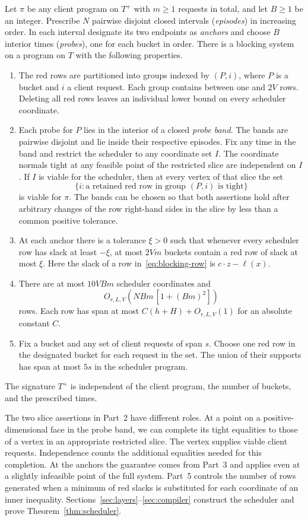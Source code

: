 \begin{theorem}[Scheduler]
Let $\pi$ be any client program on $T^+$ with $m\geq1$ requests in total,
and let $B\geq1$ be an integer. Prescribe $N$ pairwise disjoint closed intervals
(\emph{episodes}) in increasing order. In each interval designate its two
endpoints as \emph{anchors} and choose $B$ interior times
(\emph{probes}), one for each bucket in order. There is a blocking system
on a program on $T$ with the following properties.
\begin{enumerate}
\item The red rows are partitioned into groups indexed by $(P,i)$, where
$P$ is a bucket and $i$ a client request. Each group contains between one
and $2V$ rows. Deleting all red rows leaves an individual lower bound on
every scheduler coordinate.
\item Each probe for $P$ lies in the interior of a closed \emph{probe band}.
The bands are pairwise disjoint and lie inside their respective episodes.
Fix any time in the band and restrict the scheduler to any
coordinate set $I$. The coordinate normals tight at any feasible point of
the restricted slice are independent on $I$. If $I$ is viable for the
scheduler, then at every vertex of that slice the set
\[
   \{i:\text{a retained red row in group }(P,i)\text{ is tight}\}
\]
is viable for $\pi$. The bands can be chosen so that both assertions hold
after arbitrary changes of the row right-hand sides in the slice by less
than a common positive tolerance.
\item At each anchor there is a tolerance $\xi>0$ such that whenever
every scheduler row has slack at least $-\xi$, at most $2Vm$ buckets
contain a red row of slack at most $\xi$. Here the slack of a row
in~\eqref{eq:blocking-row} is $c\cdot z-\ell(x)$.
\item There are at most $10VBm$ scheduler coordinates and
\[
               O_{r,L,V}\!\left(NBm\,[1+(Bm)^2]\right)
\]
rows. Each row has span at most $C(h+H)+O_{r,L,V}(1)$ for an absolute
constant $C$.
\item Fix a bucket and any set of client requests of span $s$. Choose one
red row in the designated bucket for each request in the set. The union
of their supports has span at most $5s$ in the scheduler program.
\end{enumerate}
The signature $T^+$ is independent of the client program, the number of
buckets, and the prescribed times.
\end{theorem}

The two slice assertions in Part~2 have different roles. At a point on a
positive-dimensional face in the probe band, we can complete its tight
equalities to those of a vertex in an appropriate restricted slice. The
vertex supplies viable client requests. Independence counts the additional
equalities needed for this completion. At the anchors the guarantee comes
from Part~3 and applies even at a slightly infeasible point of the full
system. Part~5 controls the number of rows generated when a minimum of
red slacks is substituted for each coordinate of an inner inequality.
Sections~\ref{sec:layers}--\ref{sec:compiler} construct the scheduler
and prove Theorem~\ref{thm:scheduler}.
